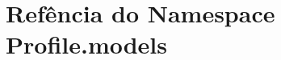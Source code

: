 \hypertarget{namespaceProfile_1_1models}{\section{Refência do Namespace Profile.\-models}
\label{dc/dfb/namespaceProfile_1_1models}
}
